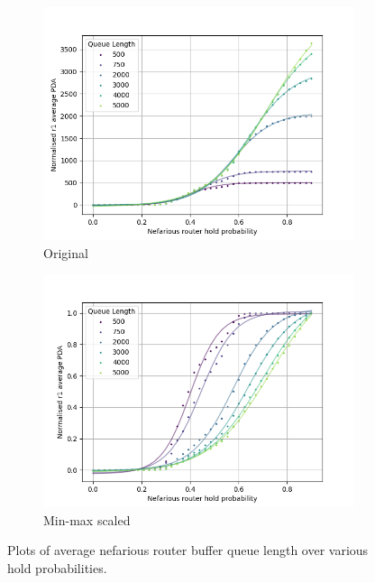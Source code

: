 \begin{figure}[H]
    \centering
    \begin{subfigure}{0.475\textwidth}
        \includegraphics[width=\textwidth]{figs/results/qlen_fitting/qlen_PDA_lm.png}
        \caption{Original}
    \end{subfigure}
    \begin{subfigure}{0.475\textwidth}
        \includegraphics[width=\textwidth]{figs/results/qlen_fitting/norm_qlen_PDA_lm.png}
        \caption{Min-max scaled}
    \end{subfigure}
    \caption{Plots of average nefarious router buffer queue length over various hold probabilities.}
    \label{fig:Rvariedqlenpda}
\end{figure}
  
